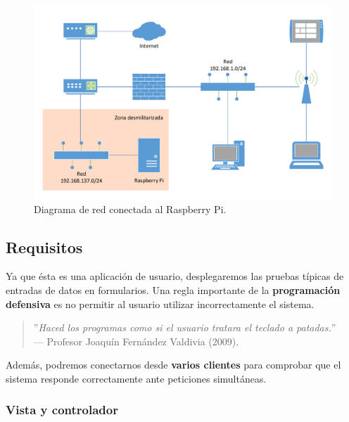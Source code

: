 \begin{figure}[H]
	\noindent \begin{centering}
		\includegraphics[width=\linewidth*3/4]{capitulo6/network}
		\par\end{centering}
	\smallskip
	\caption{\label{fig:network} Diagrama de red conectada al Raspberry Pi.}
\end{figure}

\smallskip

\subsection{Requisitos}

Ya que ésta es una aplicación de usuario, desplegaremos las pruebas típicas de entradas de datos en formularios. Una regla importante de la \textbf{programación defensiva} es no permitir al usuario utilizar incorrectamente el sistema.

\bigskip

\begin{quote}
	\small \flushright ''\textit{Haced los programas como si el usuario tratara el teclado a patadas.}'' \\
	--- Profesor Joaquín Fernández Valdivia (2009).
\end{quote}

\bigskip

Además, podremos conectarnos desde \textbf{varios clientes} para comprobar que el sistema responde correctamente ante peticiones simultáneas.

\subsubsection{Vista y controlador}

